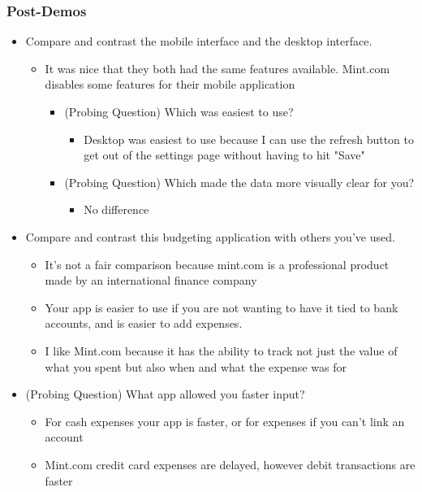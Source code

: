 \documentclass{chi2011}
\begin{document}
	\subsubsection{Post-Demos}
	\begin{itemize}[noitemsep]
		\item Compare and contrast the mobile interface and the desktop interface.
		\begin{itemize}[noitemsep]
			\item It was nice that they both had the same features available. Mint.com disables some
				  features for their mobile application
			\begin{itemize}[noitemsep]
				\item (Probing Question) Which was easiest to use?
				\begin{itemize}[noitemsep]
					\item Desktop was easiest to use because I can use the refresh button to get out of the
						  settings page without having to hit "Save"
				\end{itemize}
			\item (Probing Question) Which made the data more visually clear for you?
				\begin{itemize}[noitemsep]
					\item No difference
				\end{itemize}
			\end{itemize}
		\end{itemize}	
	\item Compare and contrast this budgeting application with others you've used.
		\begin{itemize}[noitemsep]
			\item It's not a fair comparison because mint.com is a professional product made by an 
				  international finance company
			\item Your app is easier to use if you are not wanting to have it tied to bank accounts, and is
				  easier to add expenses.
			\item I like Mint.com because it has the ability to track not just the value of what you spent
				  but also when and what the expense was for
		\end {itemize}
	\item (Probing Question) What app allowed you faster input?
		\begin{itemize}[noitemsep]
			\item For cash expenses your app is faster, or for expenses if you can't link an account
			\item Mint.com credit card expenses are delayed, however debit transactions are faster

\end{itemize}
\end{itemize}
\end{document}
